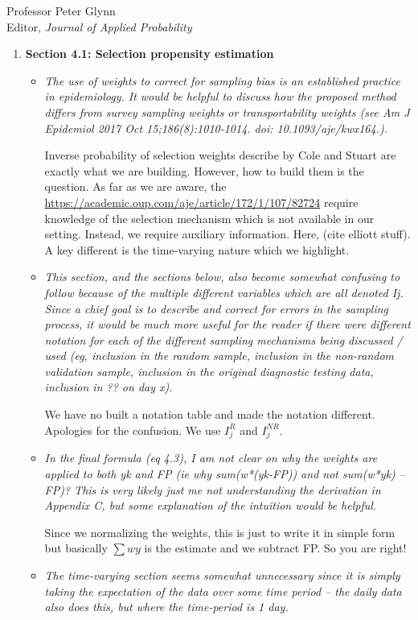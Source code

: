 \documentclass[11pt]{letter} %
\begin{document}
\begin{letter}{Professor
	Peter Glynn\\
	Editor, {\em Journal of Applied Probability}}
\begin{enumerate}
\begin{itemize}
	You got it dude.
	\vspace{5mm}
\end{itemize}
\item {\bf Section 4.1: Selection propensity estimation}
\begin{itemize}
	\item {\it The use of weights to correct for sampling bias is an established practice in epidemiology. It would be helpful to discuss how the proposed method differs from survey sampling weights or transportability weights (see Am J Epidemiol 2017 Oct 15;186(8):1010-1014. doi: 10.1093/aje/kwx164.).}
	\vspace{5mm}

	Inverse probability of selection weights describe by Cole and Stuart are exactly what we are building.  However, how to build them is the question.
	As far as we are aware, the \href{approaches}{https://academic.oup.com/aje/article/172/1/107/82724} require knowledge of the selection mechanism which is not available in our setting.  Instead, we require auxiliary information.  Here, (cite elliott stuff).  A key different is the time-varying nature which we highlight.
	\vspace{5mm}
	\item {\it This section, and the sections below, also become somewhat confusing to follow because of the multiple different variables which are all denoted Ij. Since a chief goal is to describe and correct for errors in the sampling process, it would be much more useful for the reader if there were different notation for each of the different sampling mechanisms being discussed / used (eg, inclusion in the random sample, inclusion in the non-random validation sample, inclusion in the original diagnostic testing data, inclusion in ?? on day x).}
	\vspace{5mm}

	We have no built a notation table and made the notation different.  Apologies for the confusion. We use $I_j^{R}$ and $I_j^{NR}$.
	\vspace{5mm}
	\item {\it In the final formula (eq 4.3), I am not clear on why the weights are applied to both yk and FP (ie why sum(w*(yk-FP)) and not sum(w*yk) – FP)? This is very likely just me not understanding the derivation in Appendix C, but some explanation of the intuition would be helpful.}
	\vspace{5mm}

	Since we normalizing the weights, this is just to write it in simple form but basically $\sum w y$ is the estimate and we subtract FP.  So you are right!
	\vspace{5mm}
	\item {\it The time-varying section seems somewhat unnecessary since it is simply taking the expectation of the data over some time period – the daily data also does this, but where the time-period is 1 day. }
	\vspace{5mm}


\end{itemize}
\end{enumerate}
\end{letter}
\end{document}
